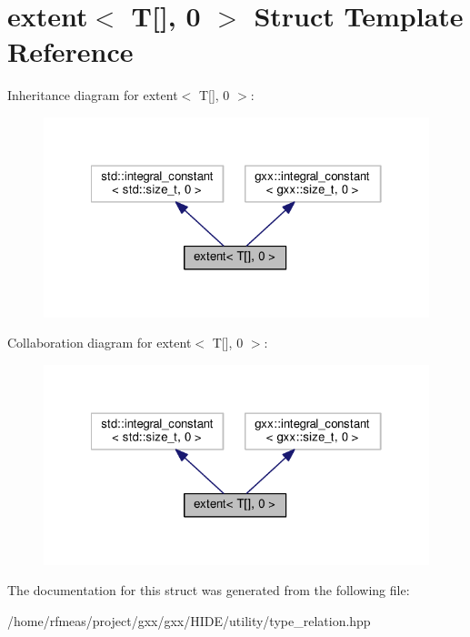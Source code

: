 \hypertarget{structextent_3_01T[]_00_010_01_4}{}\section{extent$<$ T\mbox{[}\mbox{]}, 0 $>$ Struct Template Reference}
\label{structextent_3_01T[]_00_010_01_4}


Inheritance diagram for extent$<$ T\mbox{[}\mbox{]}, 0 $>$\+:
\nopagebreak
\begin{figure}[H]
\begin{center}
\leavevmode
\includegraphics[width=322pt]{structextent_3_01T[]_00_010_01_4__inherit__graph}
\end{center}
\end{figure}


Collaboration diagram for extent$<$ T\mbox{[}\mbox{]}, 0 $>$\+:
\nopagebreak
\begin{figure}[H]
\begin{center}
\leavevmode
\includegraphics[width=322pt]{structextent_3_01T[]_00_010_01_4__coll__graph}
\end{center}
\end{figure}


The documentation for this struct was generated from the following file\+:\begin{DoxyCompactItemize}
\item 
/home/rfmeas/project/gxx/gxx/\+H\+I\+D\+E/utility/type\+\_\+relation.\+hpp\end{DoxyCompactItemize}
